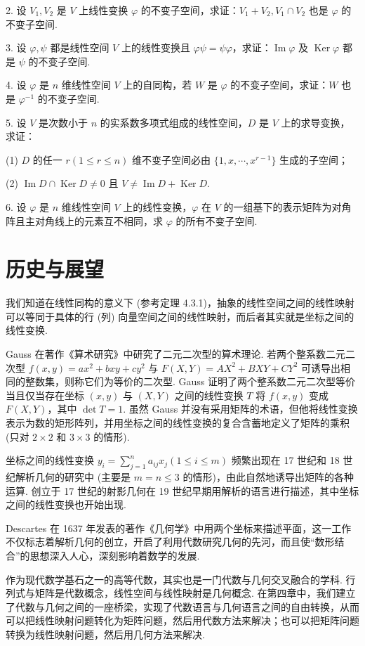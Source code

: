 \documentclass[UTF8,12pt,a4paper,fontset=fandol]{ctexart}
\begin{document}
2. 设 $V_1,V_2$ 是 $V$ 上线性变换 $\varphi$ 的不变子空间，求证：$V_1+V_2,V_1\cap V_2$ 也是 $\varphi$ 的不变子空间.

3. 设 $\varphi,\psi$ 都是线性空间 $V$ 上的线性变换且 $\varphi\psi=\psi\varphi$，求证：$\operatorname{Im}\varphi$ 及 $\operatorname{Ker}\varphi$ 都是 $\psi$ 的不变子空间.

4. 设 $\varphi$ 是 $n$ 维线性空间 $V$ 上的自同构，若 $W$ 是 $\varphi$ 的不变子空间，求证：$W$ 也是 $\varphi^{-1}$ 的不变子空间.

5. 设 $V$ 是次数小于 $n$ 的实系数多项式组成的线性空间，$D$ 是 $V$ 上的求导变换，求证：

(1) $D$ 的任一 $r(1\leq r\leq n)$ 维不变子空间必由 $\{1,x,\cdots,x^{r-1}\}$ 生成的子空间；

(2) $\operatorname{Im}D\cap\operatorname{Ker}D\neq 0$ 且 $V\neq\operatorname{Im}D+\operatorname{Ker}D$.

6. 设 $\varphi$ 是 $n$ 维线性空间 $V$ 上的线性变换，$\varphi$ 在 $V$ 的一组基下的表示矩阵为对角阵且主对角线上的元素互不相同，求 $\varphi$ 的所有不变子空间.

\section*{历史与展望}

我们知道在线性同构的意义下 (参考定理 4.3.1)，抽象的线性空间之间的线性映射可以等同于具体的行 (列) 向量空间之间的线性映射，而后者其实就是坐标之间的线性变换.

Gauss 在著作《算术研究》中研究了二元二次型的算术理论. 若两个整系数二元二次型 $f(x,y)=ax^2+bxy+cy^2$ 与 $F(X,Y)=AX^2+BXY+CY^2$ 可诱导出相同的整数集，则称它们为等价的二次型. Gauss 证明了两个整系数二元二次型等价当且仅当存在坐标 $(x,y)$ 与 $(X,Y)$ 之间的线性变换 $T$ 将 $f(x,y)$ 变成 $F(X,Y)$，其中 $\det T=1$. 虽然 Gauss 并没有采用矩阵的术语，但他将线性变换表示为数的矩形阵列，并用坐标之间的线性变换的复合含蓄地定义了矩阵的乘积 (只对 $2\times 2$ 和 $3\times 3$ 的情形).

坐标之间的线性变换 $y_i=\sum_{j=1}^n a_{ij}x_j(1\leq i\leq m)$ 频繁出现在 17 世纪和 18 世纪解析几何的研究中 (主要是 $m=n\leq 3$ 的情形)，由此自然地诱导出矩阵的各种运算. 创立于 17 世纪的射影几何在 19 世纪早期用解析的语言进行描述，其中坐标之间的线性变换也开始出现.

Descartes 在 1637 年发表的著作《几何学》中用两个坐标来描述平面，这一工作不仅标志着解析几何的创立，开启了利用代数研究几何的先河，而且使“数形结合”的思想深入人心，深刻影响着数学的发展.

作为现代数学基石之一的高等代数，其实也是一门代数与几何交叉融合的学科. 行列式与矩阵是代数概念，线性空间与线性映射是几何概念. 在第四章中，我们建立了代数与几何之间的一座桥梁，实现了代数语言与几何语言之间的自由转换，从而可以把线性映射问题转化为矩阵问题，然后用代数方法来解决；也可以把矩阵问题转换为线性映射问题，然后用几何方法来解决.
\end{document}
